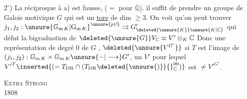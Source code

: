$2^\circ$) La réciproque à a) est fausse,  ($=$ pour $\overline{\mathbb Q}$). il suffit de prendre un groupe de Galois motivique $G$ qui est un \uline{tore} de dim $\geq 3$. On voit qu'on peut trouver 
$j_1,j_2:{\unsure{\mathbb G_{\mathrm m\,K}|\mathrm G_{\mathrm m\,K}}}^{\unsure{p|\prime}}\rightrightarrows G'_{\deleted{\unsure{K}}\unsure{K|\mathbb C}}$ qui défnt  la bigraduation de
$\deleted{\unsure{G}}V_{\mathbb C}\simeq V'\otimes_K\mathbb C$ \quad [$V'=P\mathbin{\overset{G_K}{\deleted{\unsure{\times}}}}V$, $P\unsure{\simeq|=}\underline{\operatorname{Isom}}_{\otimes}(T_{\mathrm B}\otimes K,T_{\mathrm{DR}})$]
Donc une représentation  de degré 0 de $G$ , $\deleted{\unsure{V^{G'}}}$ si $T$ est l'image de $(j_1,j_2):\mathbb G_{\mathrm m\,K}\times\mathbb G_{\mathrm m\,K}\unsure{-|\longrightarrow}G'$, un $V'$ pour lequel
${V'}^{T}\inserted{(=T_{\mathrm{DR}}\cap(T_{\mathrm{DR}}\deleted{\unsure{)}}{}_{\mathbb C}^{00})}$
 est $\ne {V'}^{G'}$.
\par\noindent\textsc{Extra Strong}\\
 1808

